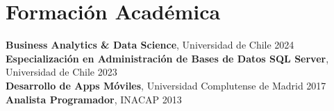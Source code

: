 \documentclass[11pt,letterpaper]{article}
\begin{document}
\section{Formaci\'{o}n Acad\'{e}mica}
\textbf{Business Analytics \& Data Science}, Universidad de Chile \hfill 2024 \\
\textbf{Especialización en Administración de Bases de Datos SQL Server}, Universidad de Chile \hfill 2023 \\
\textbf{Desarrollo de Apps Móviles}, Universidad Complutense de Madrid \hfill 2017 \\
\textbf{Analista Programador}, INACAP \hfill 2013
\end{document}
